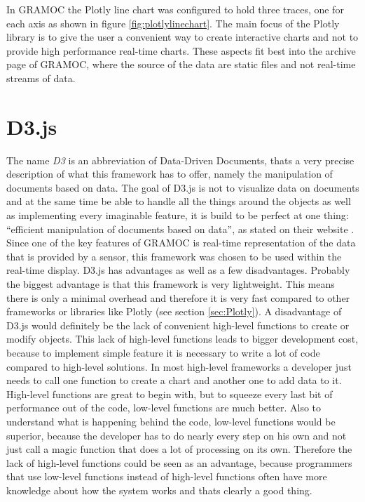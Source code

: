 In GRAMOC the Plotly line chart was configured to hold three traces, one for each axis as shown in figure \vref{fig:plotlylinechart}. The main focus of the Plotly library is to give the user a convenient way to create interactive charts and not to provide high performance real-time charts. These aspects fit best into the archive page of GRAMOC, where the source of the data are static files and not real-time streams of data.

\section{D3.js}
The name \textit{D3} is an abbreviation of Data-Driven Documents, thats a very precise description of what this framework has to offer, namely the manipulation of documents based on data. The goal of D3.js is not to visualize data on documents and at the same time be able to handle all the things around the objects as well as implementing every imaginable feature, it is build to be perfect at one thing: ``efficient manipulation of documents based on data'', as stated on their website \autocite{d3}. Since one of the key features of GRAMOC is real-time representation of the data that is provided by a sensor, this framework was chosen to be used within the real-time display. D3.js has advantages as well as a few disadvantages. Probably the biggest advantage is that this framework is very lightweight. This means there is only a minimal overhead and therefore it is very fast compared to other frameworks or libraries like Plotly (see section \vref{sec:Plotly}). A disadvantage of D3.js would definitely be the lack of convenient high-level functions to create or modify objects. This lack of high-level functions leads to bigger development cost, because to implement simple feature it is necessary to write a lot of code compared to high-level solutions. In most high-level frameworks a developer just needs to call one function to create a chart and another one to add data to it. High-level functions are great to begin with, but to squeeze every last bit of performance out of the code, low-level functions are much better. Also to understand what is happening behind the code, low-level functions would be superior, because the developer has to do nearly every step on his own and not just call a magic function that does a lot of processing on its own. Therefore the lack of high-level functions could be seen as an advantage, because programmers that use low-level functions instead of high-level functions often have more knowledge about how the system works and thats clearly a good thing.

